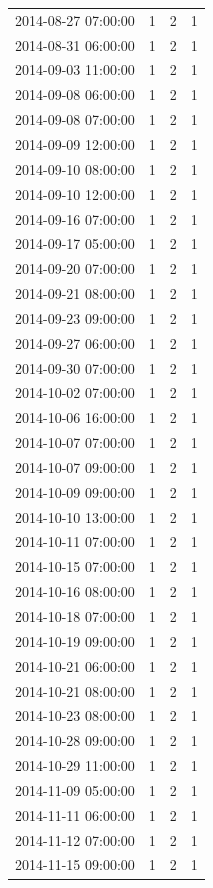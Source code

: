 \begin{tabular}{lrrr}
2014-08-27 07:00:00 & 1 & 2 & 1 \\
2014-08-31 06:00:00 & 1 & 2 & 1 \\
2014-09-03 11:00:00 & 1 & 2 & 1 \\
2014-09-08 06:00:00 & 1 & 2 & 1 \\
2014-09-08 07:00:00 & 1 & 2 & 1 \\
2014-09-09 12:00:00 & 1 & 2 & 1 \\
2014-09-10 08:00:00 & 1 & 2 & 1 \\
2014-09-10 12:00:00 & 1 & 2 & 1 \\
2014-09-16 07:00:00 & 1 & 2 & 1 \\
2014-09-17 05:00:00 & 1 & 2 & 1 \\
2014-09-20 07:00:00 & 1 & 2 & 1 \\
2014-09-21 08:00:00 & 1 & 2 & 1 \\
2014-09-23 09:00:00 & 1 & 2 & 1 \\
2014-09-27 06:00:00 & 1 & 2 & 1 \\
2014-09-30 07:00:00 & 1 & 2 & 1 \\
2014-10-02 07:00:00 & 1 & 2 & 1 \\
2014-10-06 16:00:00 & 1 & 2 & 1 \\
2014-10-07 07:00:00 & 1 & 2 & 1 \\
2014-10-07 09:00:00 & 1 & 2 & 1 \\
2014-10-09 09:00:00 & 1 & 2 & 1 \\
2014-10-10 13:00:00 & 1 & 2 & 1 \\
2014-10-11 07:00:00 & 1 & 2 & 1 \\
2014-10-15 07:00:00 & 1 & 2 & 1 \\
2014-10-16 08:00:00 & 1 & 2 & 1 \\
2014-10-18 07:00:00 & 1 & 2 & 1 \\
2014-10-19 09:00:00 & 1 & 2 & 1 \\
2014-10-21 06:00:00 & 1 & 2 & 1 \\
2014-10-21 08:00:00 & 1 & 2 & 1 \\
2014-10-23 08:00:00 & 1 & 2 & 1 \\
2014-10-28 09:00:00 & 1 & 2 & 1 \\
2014-10-29 11:00:00 & 1 & 2 & 1 \\
2014-11-09 05:00:00 & 1 & 2 & 1 \\
2014-11-11 06:00:00 & 1 & 2 & 1 \\
2014-11-12 07:00:00 & 1 & 2 & 1 \\
2014-11-15 09:00:00 & 1 & 2 & 1 \\

\end{tabular}
